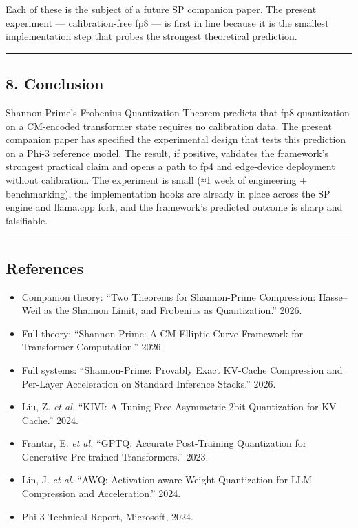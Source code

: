 \documentclass[
  11pt,
]{article}
\providecommand{\tightlist}{%
  \setlength{\itemsep}{0pt}\setlength{\parskip}{0pt}}
\begin{document}
Each of these is the subject of a future SP companion paper. The present
experiment --- calibration-free fp8 --- is first in line because it is
the smallest implementation step that probes the strongest theoretical
prediction.

\begin{center}\rule{0.5\linewidth}{0.5pt}\end{center}

\hypertarget{conclusion}{%
\subsection{8. Conclusion}\label{conclusion}}

Shannon-Prime's Frobenius Quantization Theorem predicts that fp8
quantization on a CM-encoded transformer state requires no calibration
data. The present companion paper has specified the experimental design
that tests this prediction on a Phi-3 reference model. The result, if
positive, validates the framework's strongest practical claim and opens
a path to fp4 and edge-device deployment without calibration. The
experiment is small (≈1 week of engineering + benchmarking), the
implementation hooks are already in place across the SP engine and
llama.cpp fork, and the framework's predicted outcome is sharp and
falsifiable.

\begin{center}\rule{0.5\linewidth}{0.5pt}\end{center}

\hypertarget{references}{%
\subsection{References}\label{references}}

\begin{itemize}
\tightlist
\item
  Companion theory: ``Two Theorems for Shannon-Prime Compression:
  Hasse--Weil as the Shannon Limit, and Frobenius as Quantization.''
  2026.
\item
  Full theory: ``Shannon-Prime: A CM-Elliptic-Curve Framework for
  Transformer Computation.'' 2026.
\item
  Full systems: ``Shannon-Prime: Provably Exact KV-Cache Compression and
  Per-Layer Acceleration on Standard Inference Stacks.'' 2026.
\item
  Liu, Z. \emph{et al.} ``KIVI: A Tuning-Free Asymmetric 2bit
  Quantization for KV Cache.'' 2024.
\item
  Frantar, E. \emph{et al.} ``GPTQ: Accurate Post-Training Quantization
  for Generative Pre-trained Transformers.'' 2023.
\item
  Lin, J. \emph{et al.} ``AWQ: Activation-aware Weight Quantization for
  LLM Compression and Acceleration.'' 2024.
\item
  Phi-3 Technical Report, Microsoft, 2024.
\end{itemize}
\end{document}
